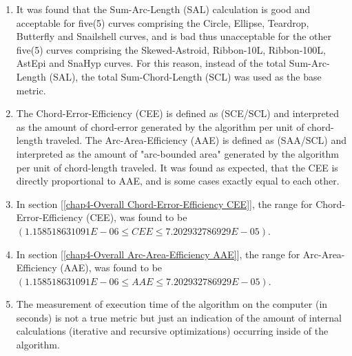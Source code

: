 \begin{enumerate}
\item It was found that the Sum-Arc-Length (SAL) calculation is good and acceptable for five(5) curves comprising the Circle, Ellipse, Teardrop, Butterfly and Snailshell curves, and is bad thus unacceptable for the other five(5) curves comprising the Skewed-Astroid, Ribbon-10L, Ribbon-100L, AstEpi and SnaHyp curves. For this reason, instead of the total Sum-Arc-Length (SAL), the total Sum-Chord-Length (SCL) was used as the base metric. 
 
\item The Chord-Error-Efficiency (CEE) is defined as (SCE/SCL) and interpreted as the amount of chord-error generated by the algorithm per unit of chord-length traveled. The Arc-Area-Efficiency (AAE) is defined as (SAA/SCL) and interpreted as the amount of "arc-bounded area" generated by the algorithm per unit of chord-length traveled. It was found as expected, that the CEE is directly proportional to AAE, and is some cases exactly equal to each other.

\item In section [\ref{chap4-Overall Chord-Error-Efficiency CEE}], the range for Chord-Error-Efficiency (CEE), was found to be $(1.158518631091E-06 \le CEE \le 7.202932786929E-05)$. 

\item In section [\ref{chap4-Overall Arc-Area-Efficiency AAE}], the range for Arc-Area-Efficiency (AAE), was found to be $(1.158518631091E-06 \le AAE \le 7.202932786929E-05)$. 

\item The measurement of execution time of the algorithm on the computer (in seconds) is not a true metric but just an indication of the amount of internal calculations (iterative and recursive optimizations) occurring inside of the algorithm.

\end{enumerate}

